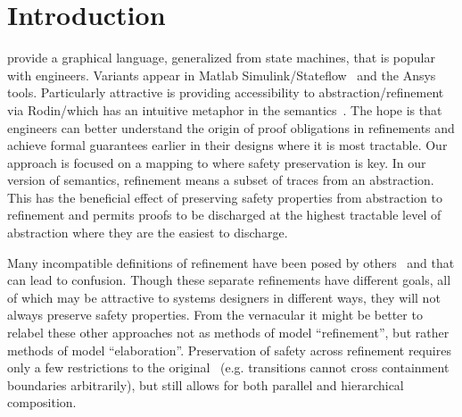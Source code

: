 

\section{Introduction}

\SCs provide a graphical language, generalized from state machines, that is popular with engineers.
Variants appear in Matlab Simulink/Stateflow~\cite{MATLAB:2019} and the Ansys tools.  
Particularly attractive is providing accessibility to abstraction/refinement via Rodin/\EventB which has an intuitive metaphor in the \SC semantics~\cite{MoSnHo18,MoSnHo-ABZ2020}.  
The hope is that engineers can better understand the origin of proof obligations in refinements and achieve formal guarantees earlier in their designs where it is most tractable.
Our approach is focused on a mapping to \EventB where safety preservation is key.  
In our version of \SC semantics, refinement means a subset of traces from an abstraction. 
This has the beneficial effect of preserving safety properties from abstraction to refinement and permits proofs to be discharged at the highest tractable level of abstraction where they are the easiest to discharge.

Many incompatible definitions of refinement have been posed by others~\cite{Syriani_2019,Maraninchi91theargos} and that can lead to confusion.  
Though these separate refinements have different goals, all of which may be attractive to systems designers in different ways,
they will not always preserve safety properties.  
From the \EventB vernacular it might be better to relabel these other approaches not as methods of model ``refinement'', but rather methods of model ``elaboration''.  
Preservation of safety across refinement requires only a few restrictions to the original~\cite{Harel} \SCs (e.g. transitions cannot cross containment boundaries arbitrarily), but still allows for both parallel and hierarchical composition. 


